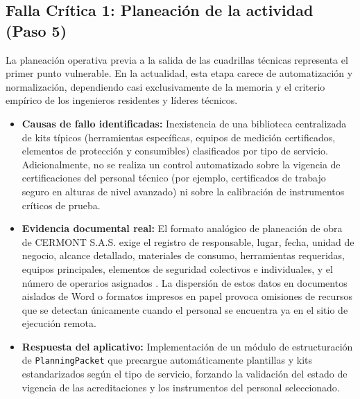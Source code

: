 \subsection{Falla Crítica 1: Planeación de la actividad (Paso 5)}
La planeación operativa previa a la salida de las cuadrillas técnicas representa el primer punto vulnerable. En la actualidad, esta etapa carece de automatización y normalización, dependiendo casi exclusivamente de la memoria y el criterio empírico de los ingenieros residentes y líderes técnicos. 
\begin{itemize}
    \item \textbf{Causas de fallo identificadas:} Inexistencia de una biblioteca centralizada de kits típicos (herramientas específicas, equipos de medición certificados, elementos de protección y consumibles) clasificados por tipo de servicio. Adicionalmente, no se realiza un control automatizado sobre la vigencia de certificaciones del personal técnico (por ejemplo, certificados de trabajo seguro en alturas de nivel avanzado) ni sobre la calibración de instrumentos críticos de prueba.
    \item \textbf{Evidencia documental real:} El formato analógico de planeación de obra de CERMONT S.A.S. exige el registro de responsable, lugar, fecha, unidad de negocio, alcance detallado, materiales de consumo, herramientas requeridas, equipos principales, elementos de seguridad colectivos e individuales, y el número de operarios asignados \cite{formato_planeacion}. La dispersión de estos datos en documentos aislados de Word o formatos impresos en papel provoca omisiones de recursos que se detectan únicamente cuando el personal se encuentra ya en el sitio de ejecución remota.
    \item \textbf{Respuesta del aplicativo:} Implementación de un módulo de estructuración de \texttt{PlanningPacket} que precargue automáticamente plantillas y kits estandarizados según el tipo de servicio, forzando la validación del estado de vigencia de las acreditaciones y los instrumentos del personal seleccionado.
\end{itemize}

